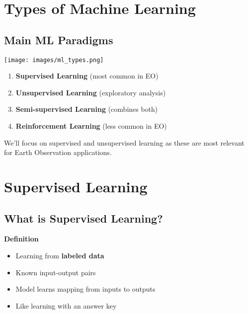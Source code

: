 \documentclass[
  letterpaper,
  DIV=11,
  numbers=noendperiod]{scrartcl}
\providecommand{\tightlist}{%
  \setlength{\itemsep}{0pt}\setlength{\parskip}{0pt}}
\begin{document}
\section{Types of Machine Learning}\label{types-of-machine-learning}

\subsection{Main ML Paradigms}\label{main-ml-paradigms}

\begin{center}
\texttt{[image: images/ml\_types.png]}
\end{center}

\begin{enumerate}
\def\labelenumi{\arabic{enumi}.}
\tightlist
\item
  \textbf{Supervised Learning} (most common in EO)
\item
  \textbf{Unsupervised Learning} (exploratory analysis)
\item
  \textbf{Semi-supervised Learning} (combines both)
\item
  \textbf{Reinforcement Learning} (less common in EO)
\end{enumerate}

We'll focus on supervised and unsupervised learning as these are most
relevant for Earth Observation applications.

\section{Supervised Learning}\label{supervised-learning}

\subsection{What is Supervised
Learning?}\label{what-is-supervised-learning}

\textbf{Definition}

\begin{itemize}
\tightlist
\item
  Learning from \textbf{labeled data}
\item
  Known input-output pairs
\item
  Model learns mapping from inputs to outputs
\item
  Like learning with an answer key
\end{itemize}
\end{document}

